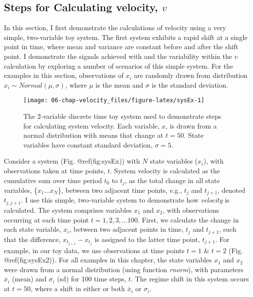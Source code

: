 \documentclass[]{article}
\begin{document}
\hypertarget{steps-for-calculating-velocity-v}{%
\subsection{\texorpdfstring{Steps for Calculating velocity,
\(v\)}{Steps for Calculating velocity, v}}\label{steps-for-calculating-velocity-v}}

In this section, I first demonstrate the calculations of velocity using
a very simple, two-variable toy system. The first system exhibits a
rapid shift at a single point in time, where mean and variance are
constant before and after the shift point. I demonstrate the signals
achieved with and the variability within the \(v\) calculation by
exploring a number of scenarios of this simple system. For the examples
in this section, observations of \(x_i\) are randomly drawn from
distribution \(x_i\sim Normal(\mu, \sigma)\), where \(\mu\) is the mean
and \(\sigma\) is the standard deviation.

\begin{figure}

{\centering \texttt{[image: 06-chap-velocity\_files/figure-latex/sysEx-1]} 

}

\caption{The 2-variable discrete time toy system used to demonstrate steps for calculating system velocity. Each variable, $x$, is drawn from a normal distribution with means that change at $t = 50$. State variables have constant standard deviation, $\sigma = 5$.}\label{fig:sysEx}
\end{figure}

Consider a system (Fig. @ref(fig:sysEx)) with \(N\) state variables
(\(x_i\)), with observations taken at time points, \(t\). System
velocity is calculated as the cumulative sum over time period \(t_0\) to
\(t_j\), as the total change in all state variables, \{\(x_1 ...x_N\)\},
between two adjacent time points, e.g., \(t_j\) and \(t_{j+1}\), denoted
\(t_{j,j+1}\). I use this simple, two-variable system to demonstrate how
\emph{velocity} is calculated. The system comprises variables \(x_1\)
and \(x_2\), with observations occurring at each time point
\(t = {1,2,3,...100}\). First, we calculate the change in each state
variable, \(x_i\), between two adjacent points in time, \(t_j\) and
\(t_{j+1}\), such that the difference, \(x_{t_{j+1}} - x_{t_j}\) is
assigned to the latter time point, \(t_{j+1}\). For example, in our toy
data, we use observations at time points \(t = 1\) \& \(t=2\) (Fig.
@ref(fig:sysEx2)). For all examples in this chapter, the state variables
\(x_1\) and \(x_2\) were drawn from a normal distribution (using
function \emph{rnorm}), with parameters \(\bar{x}_i\) (mean) and
\(\sigma_i\) (sd) for 100 time steps, \(t\). The regime shift in this
system occurs at \(t=50\), where a shift in either or both \(\bar{x}_i\)
or \(\sigma_i\).
\end{document}
